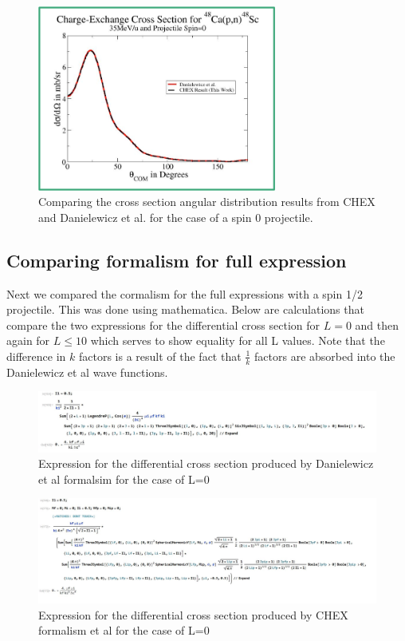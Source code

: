 \documentclass{article}
\begin{document}
\begin{figure}[H]
	\centering 
    \includegraphics[width=0.7\textwidth]{Spin0.png}
    \caption{Comparing the cross section angular distribution results from CHEX and Danielewicz et al. for the case of a spin 0 projectile.}
    \label{fig:spin0}
\end{figure}

\subsection{Comparing formalism for full expression}

Next we compared the cormalism for the full expressions with a spin 1/2 projectile.  This was done using mathematica.  Below are calculations that compare the two expressions for the differential cross section for $L=0$ and then again for $L \le 10$ which serves to show equality for all L values.  Note that the difference in $k$ factors is a result of the fact that $\frac{1}{k}$ factors are absorbed into the Danielewicz et al wave functions.  

\begin{figure}[H]
	\centering 
    \includegraphics[width=1\textwidth]{PawelL0formalism.JPG}
    \caption{Expression for the differential cross section produced by Danielewicz et al formalsim for the case of L=0}
    \label{fig:spin0}
\end{figure}

\begin{figure}[H]
	\centering 
    \includegraphics[width=1\textwidth]{TerriL0formalism.JPG}
    \caption{Expression for the differential cross section produced by CHEX formalism et al for the case of L=0}
    \label{fig:spin0}
\end{figure}
\end{document}
